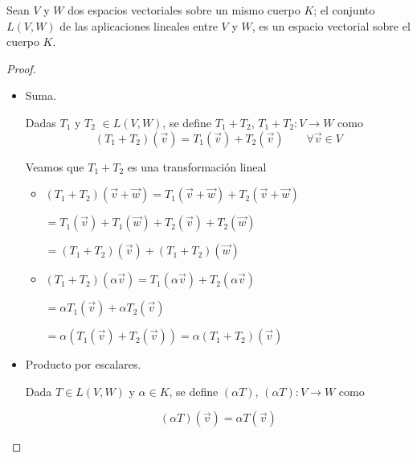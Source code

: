 


\bigskip


\bigskip


\begin{corollary}
\label{TEO2}
Sean $V$ y $W$ dos espacios vectoriales sobre un mismo cuerpo $K$; el conjunto $L(V,W)$ de las aplicaciones lineales entre $V$ y $W$, es un espacio vectorial sobre el cuerpo $K$. 

\begin{proof}
\begin{itemize}
\item
Suma. 

Dadas $T_1$ y $T_2$ $ \in  L(V,W)$, se define $T_1+T_2$, $T_1+T_2: V \rightarrow W$  como 
$$ (T_1+T_2)(\vec{v})=  T_1(\vec{v})  +T_2(\vec{v}) \qquad \forall  \vec{v}\in V $$

Veamos que $T_1+T_2$ es una transformación lineal



\begin{itemize}
\item $(T_1+T_2)(\vec{v} + \vec{w} ) = T_1(\vec{v} + \vec{w} )  +  T_2(\vec{v} + \vec{w} )$

$= T_1(\vec{v}) +T_1( \vec{w} )  +  T_2(\vec{v} )+ T_2(\vec{w} )$

$=(T_1+T_2)(\vec{v})     + (T_1+T_2) (\vec{w})$

\bigskip

\bigskip

\item 
$ (T_1+T_2)( \alpha \vec{v})=  T_1( \alpha \vec{v}) + T_2( \alpha \vec{v}) $ 

$=  \alpha T_1( \vec{v}) + \alpha T_2( \vec{v}) $

$= \alpha (T_1( \vec{v}) +  T_2( \vec{v})) = \alpha (T_1 +  T_2)( \vec{v}) $
\end{itemize}

\bigskip

\bigskip

\item
Producto por escalares. 

Dada $T \in L(V,W)$ y $\alpha \in K$, se define  $(\alpha T)$, $(\alpha T): V \rightarrow W$ como 

$$ (\alpha T)(\vec{v})=  \alpha T ( \vec{v}) $$



\end{itemize}
\end{proof}
\end{corollary}
